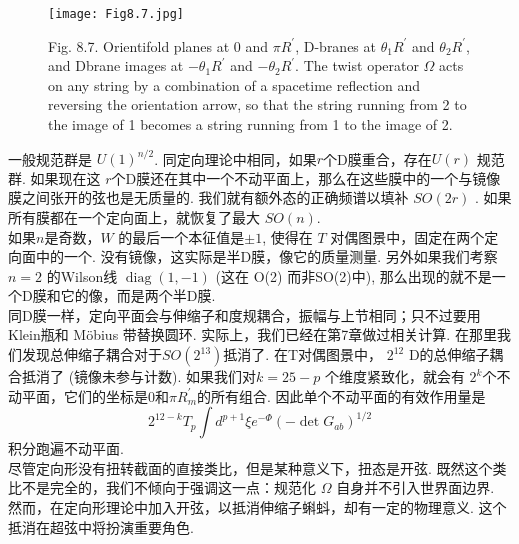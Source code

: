 \begin{figure}
	\begin{center}
		\texttt{[image: Fig8.7.jpg]}\\
		\caption{Fig. 8.7. Orientifold planes at 0 and $\pi R^{\prime}$, D-branes at $\theta_{1} R^{\prime}$ and $\theta_{2} R^{\prime}$, and Dbrane images at $-\theta_{1} R^{\prime}$ and $-\theta_{2} R^{\prime} .$ The twist operator $\Omega$ acts on any string by a combination of a spacetime reflection and reversing the orientation arrow, so that the string running from 2 to the image of 1 becomes a string running from 1 to the image of 2.}\label{Fig8.7}
	\end{center}
\end{figure}

一般规范群是 $U(1)^{n / 2}$. 同定向理论中相同，如果$r$个D膜重合，存在$U(r)$ 规范群. 如果现在这 $r$个D膜还在其中一个不动平面上，那么在这些膜中的一个与镜像膜之间张开的弦也是无质量的. 我们就有额外态的正确频谱以填补 $S O(2 r) $ . 如果所有膜都在一个定向面上，就恢复了最大 $S O(n)$.\\
如果$n$是奇数，$W$ 的最后一个本征值是$\pm 1$, 使得在 $T$ 对偶图景中，固定在两个定向面中的一个. 没有镜像，这实际是半D膜，像它的质量测量. 另外如果我们考察 $n=2$ 的Wilson线 $\operatorname{diag}(1,-1)$ (这在 O(2) 而非SO(2)中), 那么出现的就不是一个D膜和它的像，而是两个半D膜.\\
同D膜一样，定向平面会与伸缩子和度规耦合，振幅与上节相同；只不过要用Klein瓶和 Möbius 带替换圆环. 实际上，我们已经在第7章做过相关计算. 在那里我们发现总伸缩子耦合对于$S O\left(2^{13}\right) $抵消了. 在T对偶图景中， $2^{12}$ D的总伸缩子耦合抵消了 (镜像未参与计数). 如果我们对$k=25-p$ 个维度紧致化，就会有 $2^{k}$个不动平面，它们的坐标是0和$\pi R_{m}^{\prime} $的所有组合. 因此单个不动平面的有效作用量是
\begin{equation}
	2^{12-k} T_{p} \int d^{p+1} \xi e^{-\Phi}\left(-\operatorname{det} G_{a b}\right)^{1 / 2}
\end{equation}
积分跑遍不动平面.\\
尽管定向形没有扭转截面的直接类比，但是某种意义下，扭态是开弦. 既然这个类比不是完全的，我们不倾向于强调这一点：规范化 $\Omega$ 自身并不引入世界面边界. 然而，在定向形理论中加入开弦，以抵消伸缩子蝌蚪，却有一定的物理意义. 这个抵消在超弦中将扮演重要角色.
